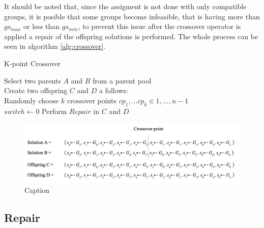 It should be noted that, since the assigment is not done with only compatible groups, it is posible that some groups become infeasible, that is having more than $gs_{max}$ or less than $gs_{min}$, to prevent this issue after the crossover operator is applied a repair of the offspring solutions is performed. The whole process can be seen in algorithm \ref{alg:crossover}.

\begin{algorithm}[H]
    \caption{K-point Crossover}
    \label{alg:crossover}
    \SetAlgoLined 
Select two parents $A$ and $B$ from a parent pool\;\\
Create two offspring $C$ and $D$ a follows:\;\\
Randomly choose $k$ crossover points $cp_1,...cp_k \in {1,...,n-1}$\;\\
$switch \gets 0$
Perform $Repair$ in $C$ and $D$
\end{algorithm}

\begin{figure}
    \centering
    \includegraphics[width=1.1\textwidth]{images/cross_over_g.png}
    \caption{Caption}
    \label{fig:crossover_ex}
\end{figure}


\subsection{Repair}

